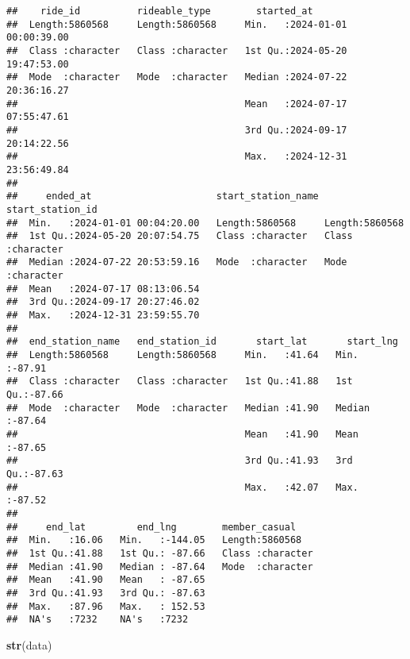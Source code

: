 \documentclass[
]{article}
\newenvironment{Shaded}{\begin{snugshade}}{\end{snugshade}}
\newcommand{\FunctionTok}[1]{\textcolor[rgb]{0.13,0.29,0.53}{\textbf{#1}}}
\newcommand{\NormalTok}[1]{#1}
\begin{document}
\begin{verbatim}
##    ride_id          rideable_type        started_at                    
##  Length:5860568     Length:5860568     Min.   :2024-01-01 00:00:39.00  
##  Class :character   Class :character   1st Qu.:2024-05-20 19:47:53.00  
##  Mode  :character   Mode  :character   Median :2024-07-22 20:36:16.27  
##                                        Mean   :2024-07-17 07:55:47.61  
##                                        3rd Qu.:2024-09-17 20:14:22.56  
##                                        Max.   :2024-12-31 23:56:49.84  
##                                                                        
##     ended_at                      start_station_name start_station_id  
##  Min.   :2024-01-01 00:04:20.00   Length:5860568     Length:5860568    
##  1st Qu.:2024-05-20 20:07:54.75   Class :character   Class :character  
##  Median :2024-07-22 20:53:59.16   Mode  :character   Mode  :character  
##  Mean   :2024-07-17 08:13:06.54                                        
##  3rd Qu.:2024-09-17 20:27:46.02                                        
##  Max.   :2024-12-31 23:59:55.70                                        
##                                                                        
##  end_station_name   end_station_id       start_lat       start_lng     
##  Length:5860568     Length:5860568     Min.   :41.64   Min.   :-87.91  
##  Class :character   Class :character   1st Qu.:41.88   1st Qu.:-87.66  
##  Mode  :character   Mode  :character   Median :41.90   Median :-87.64  
##                                        Mean   :41.90   Mean   :-87.65  
##                                        3rd Qu.:41.93   3rd Qu.:-87.63  
##                                        Max.   :42.07   Max.   :-87.52  
##                                                                        
##     end_lat         end_lng        member_casual     
##  Min.   :16.06   Min.   :-144.05   Length:5860568    
##  1st Qu.:41.88   1st Qu.: -87.66   Class :character  
##  Median :41.90   Median : -87.64   Mode  :character  
##  Mean   :41.90   Mean   : -87.65                     
##  3rd Qu.:41.93   3rd Qu.: -87.63                     
##  Max.   :87.96   Max.   : 152.53                     
##  NA's   :7232    NA's   :7232
\end{verbatim}

\begin{Shaded}
\begin{Highlighting}[]
\FunctionTok{str}\NormalTok{(data)}
\end{Highlighting}
\end{Shaded}
\end{document}
